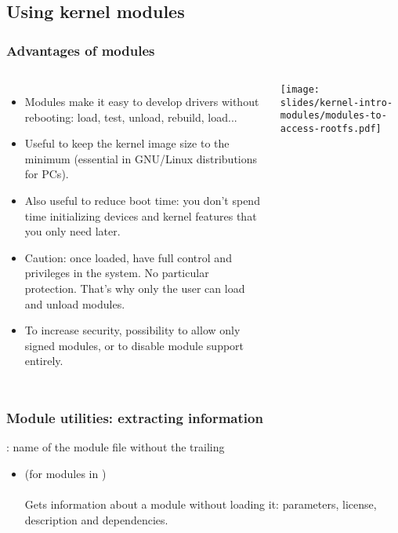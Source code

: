 \subsection{Using kernel modules}

\begin{frame}
  \frametitle{Advantages of modules}
  \begin{columns}
      \begin{itemize}
      \item Modules make it easy to develop drivers without rebooting:
        load, test, unload, rebuild, load...
      \item Useful to keep the kernel image size to the minimum (essential
        in GNU/Linux distributions for PCs).
      \item Also useful to reduce boot time: you don't spend time
        initializing devices and kernel features that you only need later.
      \item Caution: once loaded, have full control and privileges in the
        system. No particular protection. That's why only the  user
        can load and unload modules.
      \item To increase security, possibility to allow only signed modules,
        or to disable module support entirely.
      \end{itemize}
      \texttt{[image: slides/kernel-intro-modules/modules-to-access-rootfs.pdf]}
  \end{columns}
\end{frame}

\begin{frame}
  \frametitle{Module utilities: extracting information}
  : name of the module file without the trailing \\
  \begin{itemize}
  \item {} (for modules in )\\
    \\
    Gets information about a module without loading it: parameters, license,
    description and dependencies.\\
  \end{itemize}
\end{frame}

